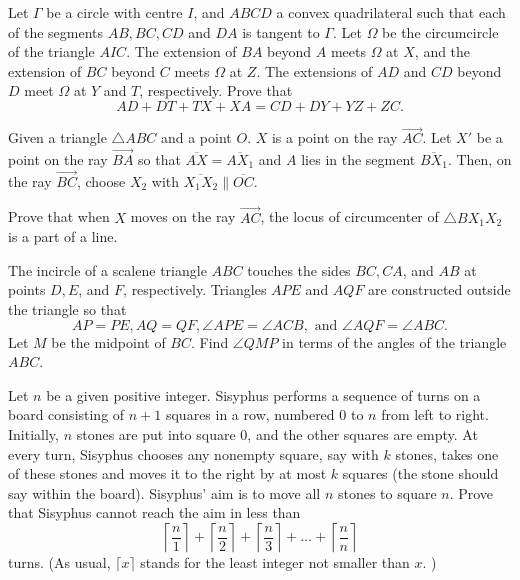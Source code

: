 \documentclass[11pt]{scrartcl}
\begin{document}
\begin{problem}[240654526717277]
Let $\Gamma$ be a circle with centre $I$, and $A B C D$ a convex quadrilateral such that each of the segments $A B, B C, C D$ and $D A$ is tangent to $\Gamma$. Let $\Omega$ be the circumcircle of the triangle $A I C$. The extension of $B A$ beyond $A$ meets $\Omega$ at $X$, and the extension of $B C$ beyond $C$ meets $\Omega$ at $Z$. The extensions of $A D$ and $C D$ beyond $D$ meet $\Omega$ at $Y$ and $T$, respectively. Prove that\[A D+D T+T X+X A=C D+D Y+Y Z+Z C.\]
\end{problem}
\begin{problem}[1790114062253914451]
	Given a triangle $ \triangle{ABC} $ and a point $ O $. $ X $ is a point on the ray $ \overrightarrow{AC} $. Let $ X' $ be a point on the ray $ \overrightarrow{BA} $ so that $ \overline{AX} = \overline{AX_{1}} $ and $ A $ lies in the segment $ \overline{BX_{1}} $. Then, on the ray $ \overrightarrow{BC} $, choose $ X_{2} $ with $ \overline{X_{1}X_{2}} \parallel \overline{OC} $.

Prove that when $ X $ moves on the ray $ \overrightarrow{AC} $, the locus of circumcenter of $ \triangle{BX_{1}X_{2}} $ is a part of a line.
\end{problem}
\begin{problem}[221552874820768]
The incircle of a scalene triangle $ABC$ touches the sides $BC, CA$, and $AB$ at points $D, E$, and $F$, respectively. Triangles $APE$ and $AQF$ are constructed outside the triangle so that\[AP =PE, AQ=QF, \angle APE=\angle ACB,\text{ and }\angle AQF =\angle ABC.\]Let $M$ be the midpoint of $BC$. Find $\angle QMP$ in terms of the angles of the triangle $ABC$.
\end{problem}
\begin{problem}[8670333331361701457]
	Let $n$ be a given positive integer. Sisyphus performs a sequence of turns on a board consisting of $n + 1$ squares in a row, numbered $0$ to $n$ from left to right. Initially, $n$ stones are put into square $0$, and the other squares are empty. At every turn, Sisyphus chooses any nonempty square, say with $k$ stones, takes one of these stones and moves it to the right by at most $k$ squares (the stone should say within the board). Sisyphus' aim is to move all $n$ stones to square $n$.
Prove that Sisyphus cannot reach the aim in less than
\[ \left \lceil \frac{n}{1} \right \rceil + \left \lceil \frac{n}{2} \right \rceil + \left \lceil \frac{n}{3} \right \rceil + \dots + \left \lceil \frac{n}{n} \right \rceil \]turns. (As usual, $\lceil x \rceil$ stands for the least integer not smaller than $x$. )
\end{problem}
\end{document}
